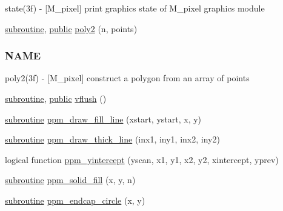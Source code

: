\begin{DoxyCompactItemize}
\begin{DoxyCompactList}
state(3f) -\/ \mbox{[}M\+\_\+pixel\mbox{]} print graphics state of M\+\_\+pixel graphics module \end{DoxyCompactList}\item 
\hyperlink{M__stopwatch_83_8txt_acfbcff50169d691ff02d4a123ed70482}{subroutine}, \hyperlink{M__stopwatch_83_8txt_a2f74811300c361e53b430611a7d1769f}{public} \hyperlink{namespacem__pixel_a996117d631dce0e92056a0c486be5109}{poly2} (n, points)
\begin{DoxyCompactList}\small\item\em \subsubsection*{N\+A\+ME}

poly2(3f) -\/ \mbox{[}M\+\_\+pixel\mbox{]} construct a polygon from an array of points \end{DoxyCompactList}\item 
\hyperlink{M__stopwatch_83_8txt_acfbcff50169d691ff02d4a123ed70482}{subroutine}, \hyperlink{M__stopwatch_83_8txt_a2f74811300c361e53b430611a7d1769f}{public} \hyperlink{namespacem__pixel_ae74cf11194379dbf13069a61b06589a2}{vflush} ()
\item 
\hyperlink{M__stopwatch_83_8txt_acfbcff50169d691ff02d4a123ed70482}{subroutine} \hyperlink{namespacem__pixel_a6f75bc951acd07267e0841ca5985d8b7}{ppm\+\_\+draw\+\_\+fill\+\_\+line} (xstart, ystart, x, y)
\item 
\hyperlink{M__stopwatch_83_8txt_acfbcff50169d691ff02d4a123ed70482}{subroutine} \hyperlink{namespacem__pixel_a1629b7134d0ea4b0f301ca23df764b8e}{ppm\+\_\+draw\+\_\+thick\+\_\+line} (inx1, iny1, inx2, iny2)
\item 
logical function \hyperlink{namespacem__pixel_a4924b3a5033acb74a4f4df60a4ba21eb}{ppm\+\_\+yintercept} (yscan, x1, y1, x2, y2, xintercept, yprev)
\item 
\hyperlink{M__stopwatch_83_8txt_acfbcff50169d691ff02d4a123ed70482}{subroutine} \hyperlink{namespacem__pixel_aedaf33a27e9899da22c2497aff2af903}{ppm\+\_\+solid\+\_\+fill} (x, y, n)
\item 
\hyperlink{M__stopwatch_83_8txt_acfbcff50169d691ff02d4a123ed70482}{subroutine} \hyperlink{namespacem__pixel_aede24c612504a3e416840e6242c2d8fb}{ppm\+\_\+endcap\+\_\+circle} (x, y)
\end{DoxyCompactItemize}
